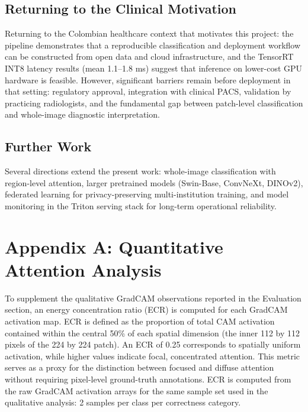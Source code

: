 \documentclass[justified,notoc,openany]{tufte-book}
\begin{document}
\section{Returning to the Clinical Motivation}\label{returning-to-the-clinical-motivation}

Returning to the Colombian healthcare context that motivates this project: the pipeline demonstrates that a reproducible classification and deployment workflow can be constructed from open data and cloud infrastructure, and the TensorRT INT8 latency results (mean 1.1--1.8 ms) suggest that inference on lower-cost GPU hardware is feasible. However, significant barriers remain before deployment in that setting: regulatory approval, integration with clinical PACS, validation by practicing radiologists, and the fundamental gap between patch-level classification and whole-image diagnostic interpretation.

\section{Further Work}\label{further-work}

Several directions extend the present work: whole-image classification with region-level attention, larger pretrained models (Swin-Base, ConvNeXt, DINOv2), federated learning for privacy-preserving multi-institution training, and model monitoring in the Triton serving stack for long-term operational reliability.

\clearpage

\appendix

\chapter{Appendix A: Quantitative Attention Analysis}\label{appendix-a-quantitative-attention-analysis-energy-concentration-ratio}

To supplement the qualitative GradCAM observations reported in the Evaluation section, an energy concentration ratio (ECR) is computed for each GradCAM activation map. ECR is defined as the proportion of total CAM activation contained within the central 50\% of each spatial dimension (the inner 112 by 112 pixels of the 224 by 224 patch). An ECR of 0.25 corresponds to spatially uniform activation, while higher values indicate focal, concentrated attention. This metric serves as a proxy for the distinction between focused and diffuse attention without requiring pixel-level ground-truth annotations. ECR is computed from the raw GradCAM activation arrays for the same sample set used in the qualitative analysis: 2 samples per class per correctness category.
\end{document}
